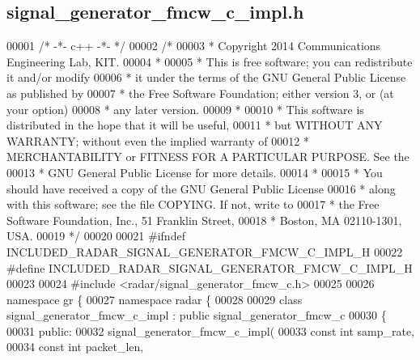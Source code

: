\subsection{signal\+\_\+generator\+\_\+fmcw\+\_\+c\+\_\+impl.\+h}
\label{signal__generator__fmcw__c__impl_8h_source}

\begin{DoxyCode}
00001 \textcolor{comment}{/* -*- c++ -*- */}
00002 \textcolor{comment}{/*}
00003 \textcolor{comment}{ * Copyright 2014 Communications Engineering Lab, KIT.}
00004 \textcolor{comment}{ *}
00005 \textcolor{comment}{ * This is free software; you can redistribute it and/or modify}
00006 \textcolor{comment}{ * it under the terms of the GNU General Public License as published by}
00007 \textcolor{comment}{ * the Free Software Foundation; either version 3, or (at your option)}
00008 \textcolor{comment}{ * any later version.}
00009 \textcolor{comment}{ *}
00010 \textcolor{comment}{ * This software is distributed in the hope that it will be useful,}
00011 \textcolor{comment}{ * but WITHOUT ANY WARRANTY; without even the implied warranty of}
00012 \textcolor{comment}{ * MERCHANTABILITY or FITNESS FOR A PARTICULAR PURPOSE.  See the}
00013 \textcolor{comment}{ * GNU General Public License for more details.}
00014 \textcolor{comment}{ *}
00015 \textcolor{comment}{ * You should have received a copy of the GNU General Public License}
00016 \textcolor{comment}{ * along with this software; see the file COPYING.  If not, write to}
00017 \textcolor{comment}{ * the Free Software Foundation, Inc., 51 Franklin Street,}
00018 \textcolor{comment}{ * Boston, MA 02110-1301, USA.}
00019 \textcolor{comment}{ */}
00020 
00021 \textcolor{preprocessor}{#ifndef INCLUDED\_RADAR\_SIGNAL\_GENERATOR\_FMCW\_C\_IMPL\_H}
00022 \textcolor{preprocessor}{#define INCLUDED\_RADAR\_SIGNAL\_GENERATOR\_FMCW\_C\_IMPL\_H}
00023 
00024 \textcolor{preprocessor}{#include <radar/signal_generator_fmcw_c.h>}
00025 
00026 \textcolor{keyword}{namespace }gr \{
00027   \textcolor{keyword}{namespace }radar \{
00028 
00029     \textcolor{keyword}{class }signal_generator_fmcw_c_impl : \textcolor{keyword}{public} signal_generator_fmcw_c
00030     \{
00031      \textcolor{keyword}{public}:
00032       signal_generator_fmcw_c_impl(
00033         \textcolor{keyword}{const} \textcolor{keywordtype}{int} samp_rate,
00034         \textcolor{keyword}{const} \textcolor{keywordtype}{int} packet\_len,

\end{DoxyCode}
